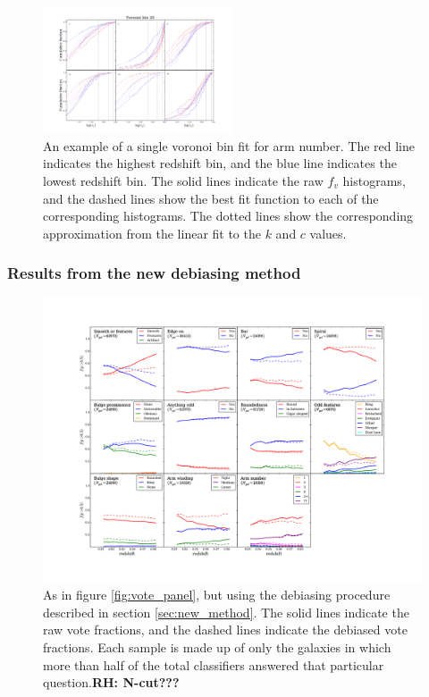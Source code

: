 \documentclass[useAMS,usenatbib]{mn2e}
\newcommand{\rh}[1]{{\bf \textcolor{RoyalPurple}{RH: #1}}}
\begin{document}
\begin{figure}
		\centering
		
        \includegraphics[width=0.5\textwidth]{Data_imgs/fit_t11_arms_number_vbin20_kcfit1.pdf}
		
        \caption{An example of a single voronoi bin fit for arm number. The red line indicates the highest redshift bin, and the blue line indicates the lowest redshift bin. The solid lines indicate the raw $f_v$ histograms, and the dashed lines show the best fit function to each of the corresponding histograms. The dotted lines show the corresponding approximation from the linear fit to the $k$ and $c$ values.}
		
        \label{fig:function_fit}
        
\end{figure}

\subsubsection{Results from the new debiasing method}

\begin{figure}
		\centering
		
        \includegraphics[width=1\textwidth]{Bias_imgs/vote_panel_plot_debiased.pdf}
		
        \caption{As in figure \ref{fig:vote_panel}, but using the debiasing procedure described in section \ref{sec:new_method}. The solid lines indicate the raw vote fractions, and the dashed lines indicate the debiased vote fractions. Each sample is made up of only the galaxies in which more than half of the total classifiers answered that particular question.\rh{N-cut???}}
		
        \label{fig:vote_panel_debiased}
        
\end{figure}
\end{document}
